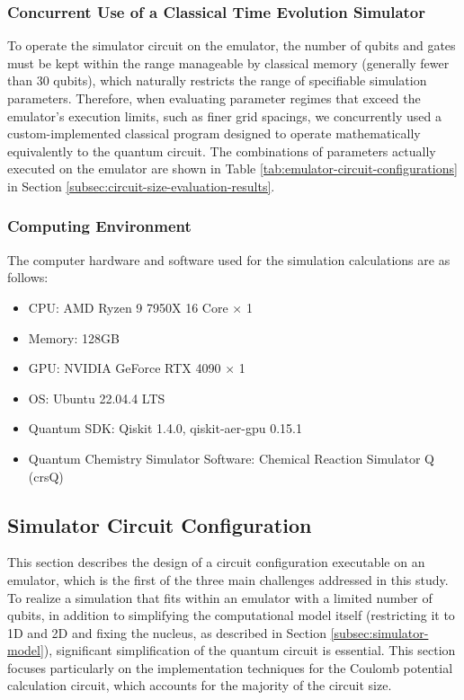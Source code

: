 \documentclass[report_2025.tex]{subfiles}
\begin{document}
\subsubsection{Concurrent Use of a Classical Time Evolution Simulator}
To operate the simulator circuit on the emulator, the number of qubits and gates
must be kept within the range manageable by classical memory (generally fewer
than 30 qubits), which naturally restricts the range of specifiable simulation
parameters. Therefore, when evaluating parameter regimes that exceed the
emulator's execution limits, such as finer grid spacings, we concurrently used a
custom-implemented classical program designed to operate mathematically
equivalently to the quantum circuit. The combinations of parameters actually
executed on the emulator are shown in Table
\ref{tab:emulator-circuit-configurations} in Section
\ref{subsec:circuit-size-evaluation-results}.

\subsubsection{Computing Environment}
The computer hardware and software used for the simulation calculations are as
follows:
\begin{itemize}
    \item CPU: AMD Ryzen 9 7950X 16 Core × 1
    \item Memory: 128GB
    \item GPU: NVIDIA GeForce RTX 4090 × 1
    \item OS: Ubuntu 22.04.4 LTS
    \item Quantum SDK: Qiskit 1.4.0, qiskit-aer-gpu 0.15.1
    \item Quantum Chemistry Simulator Software: Chemical Reaction Simulator Q (crsQ) \cite{website:crsq}
\end{itemize}

\subsection{Simulator Circuit Configuration}
\label{sec:simulator-circuit-configuration}
This section describes the design of a circuit configuration executable on an
emulator, which is the first of the three main challenges addressed in this
study. To realize a simulation that fits within an emulator with a limited
number of qubits, in addition to simplifying the computational model itself
(restricting it to 1D and 2D and fixing the nucleus, as described in Section
\ref{subsec:simulator-model}), significant simplification of the quantum circuit
is essential. This section focuses particularly on the implementation techniques
for the Coulomb potential calculation circuit, which accounts for the majority
of the circuit size.
\end{document}
